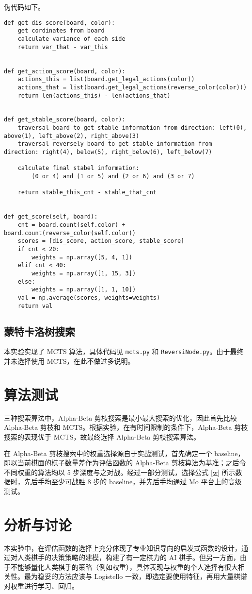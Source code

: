 \documentclass{zjureport-zh}
\begin{document}
\par 伪代码如下。
\begin{lstlisting}
def get_dis_score(board, color):
	get cordinates from board
	calculate variance of each side
	return var_that - var_this


def get_action_score(board, color):
	actions_this = list(board.get_legal_actions(color))
	actions_that = list(board.get_legal_actions(reverse_color(color)))
	return len(actions_this) - len(actions_that)


def get_stable_score(board, color):
	traversal board to get stable information from direction: left(0), above(1), left_above(2), right_above(3)
	traversal reversely board to get stable information from direction: right(4), below(5), right_below(6), left_below(7)
	
	calculate final stabel information:
		(0 or 4) and (1 or 5) and (2 or 6) and (3 or 7)
	
	return stable_this_cnt - stable_that_cnt


def get_score(self, board):
	cnt = board.count(self.color) + board.count(reverse_color(self.color))
	scores = [dis_score, action_score, stable_score]
	if cnt < 20:
		weights = np.array([5, 4, 1])
	elif cnt < 40:
		weights = np.array([1, 15, 3])
	else:
		weights = np.array([1, 1, 10])
	val = np.average(scores, weights=weights)
	return val
\end{lstlisting}


\subsection{蒙特卡洛树搜索}
\par 本实验实现了 MCTS 算法，具体代码见 \texttt{mcts.py} 和 \texttt{ReversiNode.py}。由于最终并未选择使用 MCTS，在此不做过多说明。

\section{算法测试}
\par 三种搜索算法中，Alpha-Beta 剪枝搜索是最小最大搜索的优化，因此首先比较 Alpha-Beta 剪枝和 MCTS。根据实验，在有时间限制的条件下，Alpha-Beta 剪枝搜索的表现优于 MCTS，故最终选择 Alpha-Beta 剪枝搜索算法。
\par 在 Alpha-Beta 剪枝搜索中的权重选择源自于实战测试，首先确定一个 baseline，即以当前棋面的棋子数量差作为评估函数的 Alpha-Beta 剪枝算法为基准；之后令不同权重的算法均以 5 步深度与之对战。经过一部分测试，选择公式 \ref{w} 所示数据时，先后手均至少可战胜 8 步的 baseline，并先后手均通过 Mo 平台上的高级测试。

\section{分析与讨论}
\par 本实验中，在评估函数的选择上充分体现了专业知识导向的启发式函数的设计，通过对人类棋手的决策策略的建模，构建了有一定棋力的 AI 棋手。但另一方面，由于不能够量化人类棋手的策略（例如权重），具体表现与权重的个人选择有很大相关性。最为稳妥的方法应该与 Logistello 一致，即选定要使用特征，再用大量棋谱对权重进行学习、回归。
\end{document}
